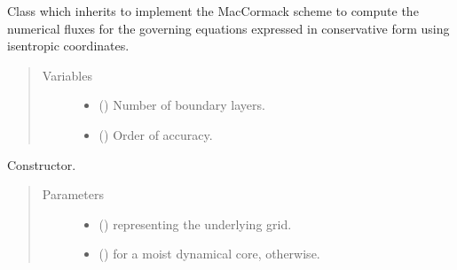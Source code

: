 \documentclass[letterpaper,10pt,english]{sphinxmanual}
\begin{document}
\begin{fulllineitems}
\label{\detokenize{api:dycore.flux_isentropic_maccormack.FluxIsentropicMacCormack}}
Class which inherits {\hyperref[\detokenize{api:dycore.flux_isentropic.FluxIsentropic}]{}} to implement the MacCormack scheme to compute
the numerical fluxes for the governing equations expressed in conservative form using isentropic coordinates.
\begin{quote}\begin{description}
\item[{Variables}] \leavevmode\begin{itemize}
\item {} 
{\hyperref[\detokenize{api:dycore.prognostic_isentropic.PrognosticIsentropic.nb}]{}} () \textendash{} Number of boundary layers.

\item {} 
 () \textendash{} Order of accuracy.

\end{itemize}

\end{description}\end{quote}

\begin{fulllineitems}
\label{\detokenize{api:dycore.flux_isentropic_maccormack.FluxIsentropicMacCormack.__init__}}
Constructor.
\begin{quote}\begin{description}
\item[{Parameters}] \leavevmode\begin{itemize}
\item {} 
 () \textendash{} {\hyperref[\detokenize{api:grids.grid_xyz.GridXYZ}]{}} representing the underlying grid.

\item {} 
 () \textendash{}  for a moist dynamical core,  otherwise.


\end{itemize}
\end{description}
\end{quote}
\end{fulllineitems}
\end{fulllineitems}
\end{document}
